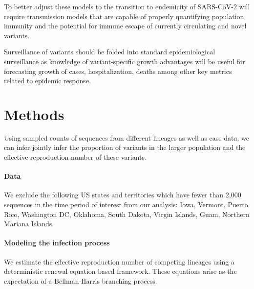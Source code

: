 \documentclass[12pt]{article}
\begin{document}
To better adjust these models to the transition to endemicity of SARS-CoV-2 will require transmission models that are capable of properly quantifying population immunity and the potential for immune escape of currently circulating and novel variants.

Surveillance of variants should be folded into standard epidemiological surveillance as knowledge of variant-specific growth advantages will be useful for forecasting growth of cases, hospitalization, deaths among other key metrics related to epidemic response.



\section{Methods}

Using sampled counts of sequences from different lineages as well as case data, we can infer jointly infer the proportion of variants in the larger population and the effective reproduction number of these variants.

\paragraph{Data}

We exclude the following US states and territories which have fewer than 2,000 sequences in the time period of interest from our analysis: Iowa, Vermont, Puerto Rico, Washington DC, Oklahoma, South Dakota, Virgin Islands, Guam, Northern Mariana Islands.

\paragraph{Modeling the infection process}%

We estimate the effective reproduction number of competing lineages using a deterministic renewal equation based framework. These equations arise as the expectation of a Bellman-Harris branching process. \cite{Bellman1948}
\end{document}
